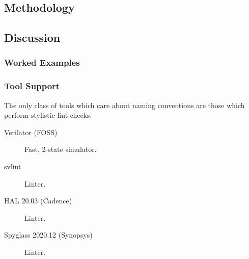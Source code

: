 \documentclass[a4paper]{article}
\begin{document}

\subsection{Methodology} %
\label{sec:SimpleAlways_methodology}


\subsection{Discussion} %
\label{sec:SimpleAlways_discussion}

\subsubsection{Worked Examples} %
\label{sec:SimpleAlways_workedExamples}


\subsubsection{Tool Support} %
\label{sec:SimpleAlways_toolSupport}
The only class of tools which care about naming conventions are those which
perform stylistic lint checks.

\begin{description}
\item[Verilator (\gls{FOSS})]
  Fast, 2-state simulator.
\item[svlint]
  Linter.
\item[HAL 20.03 (Cadence)]
  Linter.
\item[Spyglass 2020.12 (Synopsys)]
  Linter.
\end{description}
\end{document}
